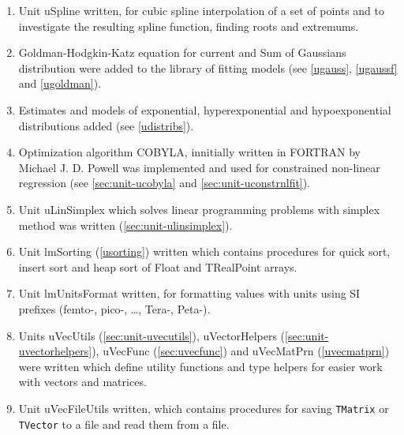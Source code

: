 \documentclass[12pt,a4paper,oneside]{report}
\newcommand{\code}[1]{\texttt{#1}}
\begin{document}
\begin{enumerate}
	\item Unit uSpline written, for cubic spline interpolation of a set of points and to investigate the resulting spline function, finding roots and extremums.
	\item Goldman-Hodgkin-Katz equation for current and Sum of Gaussians distribution were added to the library of fitting models (see \ref{ugauss}, \ref{ugaussf} and \ref{ugoldman}).
	\item Estimates and models of exponential, hyperexponential and hypoexponential distributions added (see \ref{udistribs}).
	\item Optimization algorithm COBYLA, innitially written in FORTRAN by Michael J. D. Powell was implemented and used for constrained non-linear regression (see \ref{sec:unit-ucobyla} and \ref{sec:unit-uconstrnlfit}).
	\item Unit uLinSimplex which solves linear programming problems with simplex method was written (\ref{sec:unit-ulinsimplex}).
	\item Unit lmSorting (\ref{usorting}) written which contains procedures for quick sort, insert sort and heap sort of Float and TRealPoint arrays.
	\item Unit lmUnitsFormat written, for formatting values with units using SI prefixes (femto-, pico-, \dots, Tera-, Peta-).
	\item Units uVecUtils (\ref{sec:unit-uvecutils}), uVectorHelpers (\ref{sec:unit-uvectorhelpers}), uVecFunc (\ref{sec:uvecfunc}) and uVecMatPrn (\ref{uvecmatprn}) were written which define utility functions and type helpers for easier work with vectors and matrices.
	\item Unit uVecFileUtils written, which contains procedures for saving \code{TMatrix} or \code{TVector} to a file and read them from a file.   
\end{enumerate}

\printindex[unit]
\printindex[types]
\printindex[const]
\printindex[proc]
\printindex
\end{document}
